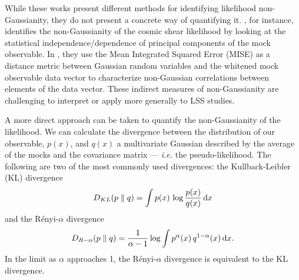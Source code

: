 \documentclass[12pt, letterpaper, preprint]{aastex}
\newcommand{\beq}{\begin{equation}}
\newcommand{\eeq}{\end{equation}}
\newcommand{\lss}{{\small{LSS}}\xspace}
\begin{document}
While these works present different methods for identifying 
likelihood non-Gaussianity, they do not present a concrete way of 
quantifying it. \cite{hartlap2009}, for instance, identifies the
non-Gaussianity of the cosmic shear likelihood by looking at the
statistical independence/dependence of principal components of the mock 
observable. In \cite{sellentin2017}, they use the Mean
Integrated Squared Error (MISE) as a distance metric between 
Gaussian random variables and the whitened mock observable 
data vector to characterize non-Gaussian correlations between elements 
of the data vector. These indirect measures of non-Gaussianity 
are challenging to interpret or apply more generally to \lss studies. 

A more direct approach can be taken to quantify the 
non-Gaussianity of the likelihood. We can calculate the divergence between 
the distribution of our observable, $p(x)$, and $q(x)$ a multivariate Gaussian described 
by the average of the mocks and the covariance matrix --- \emph{i.e.} 
the pseudo-likelihood. The following are two of the most commonly used 
divergences: the Kullback-Leibler (KL) divergence
\beq \label{eq:kl} 
D_{KL} ( p \parallel q ) = \int p(x)\,\log \frac{p(x)}{q(x)}\,{\rm d}x
\eeq
and the R\'enyi-$\alpha$ divergence
\beq \label{eq:renyi}
D_{R-\alpha} ( p \parallel q ) = \frac{1}{\alpha -1} \log \int p^\alpha(x)\, q^{1 -\alpha}(x)\,{\rm d}x. 
\eeq
In the limit as $\alpha$ approaches 1, the R\'enyi-$\alpha$ divergence is
equivalent to the KL divergence.
\end{document}
